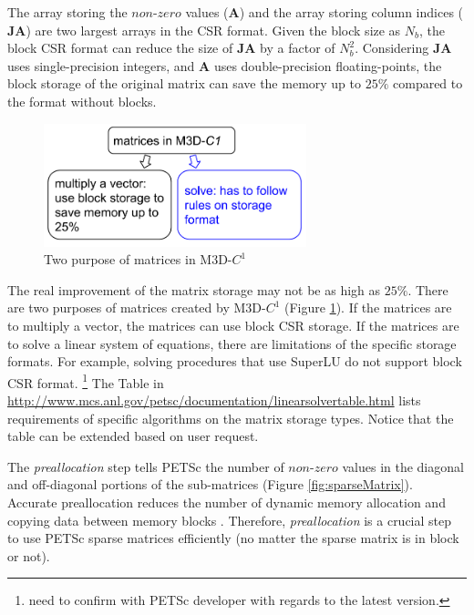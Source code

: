 \documentclass[11pt]{article}  %
\begin{document}
The array storing the $non$-$zero$ values ($\mathbf{A}$) and the array storing column indices ($\mathbf{JA}$) are two largest arrays in the CSR format.  Given the block size as $N_b$, the block CSR format can reduce the size of $\mathbf{JA}$ by a factor of $N_b^2$.  Considering $\mathbf{JA}$ uses single-precision integers, and $\mathbf{A}$ uses double-precision floating-points, the block storage of the original matrix can save the memory up to $25\%$ compared to the format without blocks.  

\begin{figure}
\center
\includegraphics[width=3in]{fig/matTypes.png}
\caption{\small{Two purpose of matrices in M3D-$C^1$}} 
\label{fig:matTypes.png}
\end{figure}

The real improvement of the matrix storage may not be as high as $25\%$. There are two purposes of matrices created by M3D-$C^1$ (Figure \ref{fig:matTypes.png}). If the matrices are to multiply a vector, the matrices can use block CSR storage. If the matrices are to solve a linear system of equations, there are limitations of the specific storage formats. For example,  solving procedures that use SuperLU  do not support block CSR format. \footnote{need to confirm with PETSc developer with regards to the latest version.} The Table in \url{http://www.mcs.anl.gov/petsc/documentation/linearsolvertable.html} lists requirements of  specific algorithms on the matrix storage types. Notice that the table can be extended based on user request. 

The  \emph{preallocation} step tells PETSc the number of $non$-$zero$ values in the diagonal and off-diagonal portions of the sub-matrices (Figure \ref{fig:sparseMatrix}).  Accurate  preallocation reduces the number of dynamic memory allocation and copying data between memory blocks \cite{petsc-web-page}. Therefore, \emph{preallocation} is a crucial step to use  PETSc sparse matrices efficiently (no matter the sparse matrix is in block or not).
\end{document}
